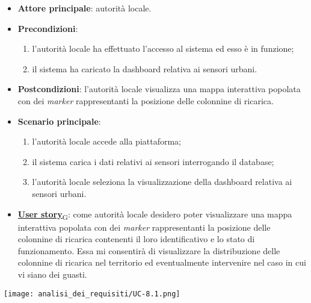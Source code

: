 \begin{itemize}
	\item \textbf{Attore principale}: autorità locale.
	\item \textbf{Precondizioni}:
	      \begin{enumerate}
		      \item l'autorità locale ha effettuato l'accesso al sistema ed esso è in funzione;
		      \item il sistema ha caricato la dashboard relativa ai sensori urbani.
	      \end{enumerate}
	\item \textbf{Postcondizioni}: l'autorità locale visualizza una mappa interattiva popolata con dei \textit{marker} rappresentanti la posizione delle colonnine di ricarica.
	\item \textbf{Scenario principale}:
	      \begin{enumerate}
		      \item l'autorità locale accede alla piattaforma;
		      \item il sistema carica i dati relativi ai sensori interrogando il database;
		      \item l'autorità locale seleziona la visualizzazione della dashboard relativa ai sensori urbani.
	      \end{enumerate}
	\item \href{https://7last.github.io/docs/rtb/documentazione-interna/glossario\#user-story}{\textbf{User story}\textsubscript{G}}:
	      come autorità locale desidero poter visualizzare una mappa interattiva popolata con dei \textit{marker} rappresentanti la posizione delle colonnine di ricarica
	      contenenti il loro identificativo e lo stato di funzionamento. Essa mi consentirà di visualizzare la distribuzione delle colonnine di ricarica nel territorio
	      ed eventualmente intervenire nel caso in cui vi siano dei guasti.
\end{itemize}
\begin{center}
	\texttt{[image: analisi\_dei\_requisiti/UC-8.1.png]}
\end{center}


